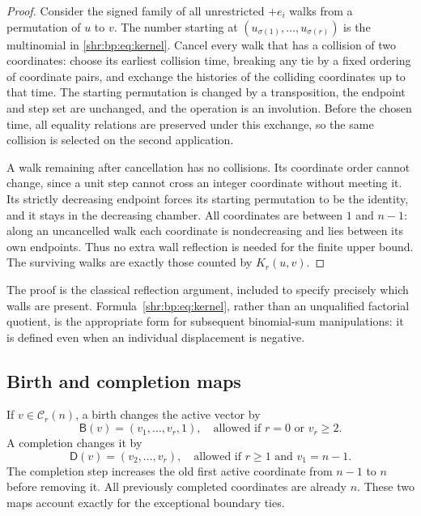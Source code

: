 \documentclass[11pt,letterpaper]{article}
\numberwithin{equation}{section}
\theoremstyle{definition}
\newcommand{\1}{\mathbf 1}
\begin{document}
\begin{proof}
Consider the signed family of all unrestricted $+e_i$ walks from a
permutation of $u$ to $v$. The number starting at
$(u_{\sigma(1)},\ldots,u_{\sigma(r)})$ is the multinomial in
\eqref{shr:bp:eq:kernel}. Cancel every walk that has a collision of two
coordinates: choose its earliest collision time, breaking any tie by a
fixed ordering of coordinate pairs, and exchange the histories of the
colliding coordinates up to that time. The starting permutation is changed
by a transposition, the endpoint and step set are unchanged, and the
operation is an involution. Before the chosen time, all equality relations
are preserved under this exchange, so the same collision is selected on
the second application.

A walk remaining after cancellation has no collisions. Its coordinate
order cannot change, since a unit step cannot cross an integer coordinate
without meeting it. Its strictly decreasing endpoint forces its starting
permutation to be the identity, and it stays in the decreasing chamber.
All coordinates are between $1$ and $n-1$: along an uncancelled walk each
coordinate is nondecreasing and lies between its own endpoints. Thus no
extra wall reflection is needed for the finite upper bound. The surviving
walks are exactly those counted by $K_r(u,v)$.
\end{proof}

The proof is the classical reflection argument, included to specify
precisely which walls are present. Formula~\eqref{shr:bp:eq:kernel}, rather than
an unqualified factorial quotient, is the appropriate form for subsequent
binomial-sum manipulations: it is defined even when an individual
displacement is negative.

\subsection{Birth and completion maps}
If $v\in\mathcal C_r(n)$, a birth changes the active vector by
\begin{equation}
 \mathsf B(v)=(v_1,\ldots,v_r,1),
 \quad\text{allowed if }r=0\text{ or }v_r\ge2.
 \label{shr:bp:eq:Bmap}
\end{equation}
A completion changes it by
\begin{equation}
 \mathsf D(v)=(v_2,\ldots,v_r),
 \quad\text{allowed if }r\ge1\text{ and }v_1=n-1.
 \label{shr:bp:eq:Dmap}
\end{equation}
The completion step increases the old first active coordinate from $n-1$
to $n$ before removing it. All previously completed coordinates are already
$n$. These two maps account exactly for the exceptional boundary ties.
\end{document}
